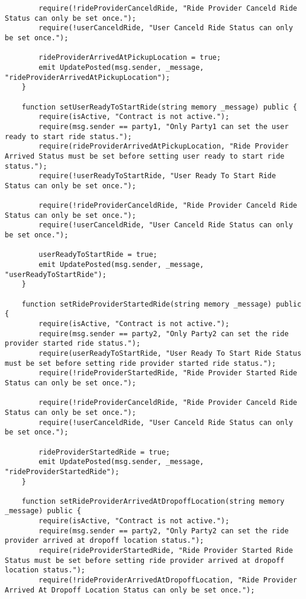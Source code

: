 \begin{lstlisting}
        require(!rideProviderCanceldRide, "Ride Provider Canceld Ride Status can only be set once.");
        require(!userCanceldRide, "User Canceld Ride Status can only be set once.");
        
        rideProviderArrivedAtPickupLocation = true;
        emit UpdatePosted(msg.sender, _message, "rideProviderArrivedAtPickupLocation");
    }

    function setUserReadyToStartRide(string memory _message) public {
        require(isActive, "Contract is not active.");
        require(msg.sender == party1, "Only Party1 can set the user ready to start ride status.");
        require(rideProviderArrivedAtPickupLocation, "Ride Provider Arrived Status must be set before setting user ready to start ride status.");
        require(!userReadyToStartRide, "User Ready To Start Ride Status can only be set once.");

        require(!rideProviderCanceldRide, "Ride Provider Canceld Ride Status can only be set once.");
        require(!userCanceldRide, "User Canceld Ride Status can only be set once.");

        userReadyToStartRide = true;
        emit UpdatePosted(msg.sender, _message, "userReadyToStartRide");
    }

    function setRideProviderStartedRide(string memory _message) public {
        require(isActive, "Contract is not active.");
        require(msg.sender == party2, "Only Party2 can set the ride provider started ride status.");
        require(userReadyToStartRide, "User Ready To Start Ride Status must be set before setting ride provider started ride status.");
        require(!rideProviderStartedRide, "Ride Provider Started Ride Status can only be set once.");

        require(!rideProviderCanceldRide, "Ride Provider Canceld Ride Status can only be set once.");
        require(!userCanceldRide, "User Canceld Ride Status can only be set once.");

        rideProviderStartedRide = true;
        emit UpdatePosted(msg.sender, _message, "rideProviderStartedRide");
    }

    function setRideProviderArrivedAtDropoffLocation(string memory _message) public {
        require(isActive, "Contract is not active.");
        require(msg.sender == party2, "Only Party2 can set the ride provider arrived at dropoff location status.");
        require(rideProviderStartedRide, "Ride Provider Started Ride Status must be set before setting ride provider arrived at dropoff location status.");
        require(!rideProviderArrivedAtDropoffLocation, "Ride Provider Arrived At Dropoff Location Status can only be set once.");


\end{lstlisting}
